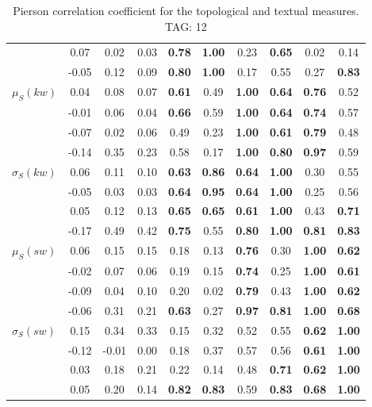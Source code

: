 \begin{table*}[h!]
\begin{center}
\begin{tabular}{| l || c | c | c | c | c | c | c | c | c |}
 & 0.07 & 0.02 & 0.03 & {\bf 0.78} & {\bf 1.00} & 0.23 & {\bf 0.65} & 0.02 & 0.14 \\
 & -0.05 & 0.12 & 0.09 & {\bf 0.80} & {\bf 1.00} & 0.17 & 0.55 & 0.27 & {\bf 0.83} \\\hline
$\mu_S(kw)$ & 0.04 & 0.08 & 0.07 & {\bf 0.61} & 0.49 & {\bf 1.00} & {\bf 0.64} & {\bf 0.76} & 0.52 \\
 & -0.01 & 0.06 & 0.04 & {\bf 0.66} & 0.59 & {\bf 1.00} & {\bf 0.64} & {\bf 0.74} & 0.57 \\
 & -0.07 & 0.02 & 0.06 & 0.49 & 0.23 & {\bf 1.00} & {\bf 0.61} & {\bf 0.79} & 0.48 \\
 & -0.14 & 0.35 & 0.23 & 0.58 & 0.17 & {\bf 1.00} & {\bf 0.80} & {\bf 0.97} & 0.59 \\\hline
$\sigma_S(kw)$ & 0.06 & 0.11 & 0.10 & {\bf 0.63} & {\bf 0.86} & {\bf 0.64} & {\bf 1.00} & 0.30 & 0.55 \\
 & -0.05 & 0.03 & 0.03 & {\bf 0.64} & {\bf 0.95} & {\bf 0.64} & {\bf 1.00} & 0.25 & 0.56 \\
 & 0.05 & 0.12 & 0.13 & {\bf 0.65} & {\bf 0.65} & {\bf 0.61} & {\bf 1.00} & 0.43 & {\bf 0.71} \\
 & -0.17 & 0.49 & 0.42 & {\bf 0.75} & 0.55 & {\bf 0.80} & {\bf 1.00} & {\bf 0.81} & {\bf 0.83} \\\hline
$\mu_S(sw)$ & 0.06 & 0.15 & 0.15 & 0.18 & 0.13 & {\bf 0.76} & 0.30 & {\bf 1.00} & {\bf 0.62} \\
 & -0.02 & 0.07 & 0.06 & 0.19 & 0.15 & {\bf 0.74} & 0.25 & {\bf 1.00} & {\bf 0.61} \\
 & -0.09 & 0.04 & 0.10 & 0.20 & 0.02 & {\bf 0.79} & 0.43 & {\bf 1.00} & {\bf 0.62} \\
 & -0.06 & 0.31 & 0.21 & {\bf 0.63} & 0.27 & {\bf 0.97} & {\bf 0.81} & {\bf 1.00} & {\bf 0.68} \\\hline
$\sigma_S(sw)$ & 0.15 & 0.34 & 0.33 & 0.15 & 0.32 & 0.52 & 0.55 & {\bf 0.62} & {\bf 1.00} \\
 & -0.12 & -0.01 & 0.00 & 0.18 & 0.37 & 0.57 & 0.56 & {\bf 0.61} & {\bf 1.00} \\
 & 0.03 & 0.18 & 0.21 & 0.22 & 0.14 & 0.48 & {\bf 0.71} & {\bf 0.62} & {\bf 1.00} \\
 & 0.05 & 0.20 & 0.14 & {\bf 0.82} & {\bf 0.83} & 0.59 & {\bf 0.83} & {\bf 0.68} & {\bf 1.00} \\\hline
\end{tabular}
\caption{Pierson correlation coefficient for the topological and textual measures. TAG: 12}
\end{center}
\end{table*}